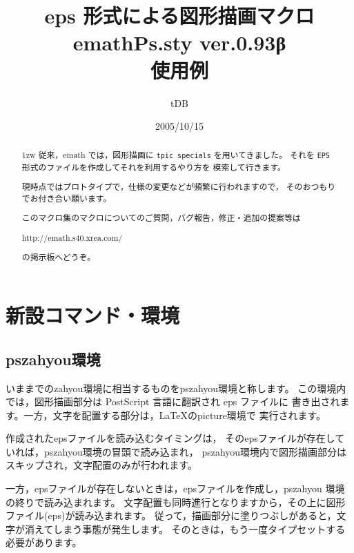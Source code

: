 \documentclass[a4j]{jarticle}
\begin{document}
\title{eps 形式による図形描画マクロ\\
emathPs.sty {\normalsize ver.0.93β}\\使用例}
\author{tDB}
\date{2005/10/15}

\maketitle\thispagestyle{empty}
\begin{abstract}%
\parindent1zw%
従来，emath では，図形描画に \texttt{tpic specials} を用いてきました。
それを \texttt{EPS}形式のファイルを作成してそれを利用するやり方を
模索して行きます。


現時点ではプロトタイプで，仕様の変更などが頻繁に行われますので，
そのおつもりでお付き合い願います。

このマクロ集のマクロについてのご質問，バグ報告，修正・追加の提案等は
\begin{center}
http://emath.s40.xrea.com/
\end{center}
の掲示板へどうぞ。
\end{abstract}
\pagebreak
{}%


\tableofcontents

\pagebreak


\section{新設コマンド・環境}
\subsection{\textsf{pszahyou}環境}
いままでの\textsf{zahyou}環境に相当するものを\textsf{pszahyou}環境と称します。
この環境内では，図形描画部分は PostScript 言語に翻訳され eps ファイルに
書き出されます。一方，文字を配置する部分は，\LaTeX の\textsf{picture}環境で
実行されます。

作成されたepsファイルを読み込むタイミングは，
そのepsファイルが存在していれば，\textsf{pszahyou}環境の冒頭で読み込まれ，
\textsf{pszahyou}環境内で図形描画部分はスキップされ，文字配置のみが行われます。

一方，epsファイルが存在しないときは，epsファイルを作成し，\textsf{pszahyou}
環境の終りで読み込まれます。
文字配置も同時進行となりますから，その上に図形ファイル(eps)が読み込まれます。
従って，描画部分に塗りつぶしがあると，文字が消えてしまう事態が発生します。
そのときは，もう一度タイプセットする必要があります。
\end{document}
